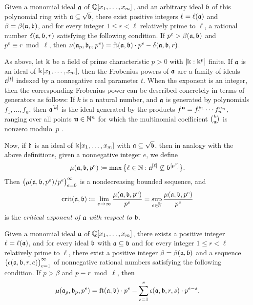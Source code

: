 \documentclass{amsart}
\begin{document}
\begin{theorem}
   \label{general-nu-theorem: T}
   Given a monomial ideal $\mathfrak{a}$ of $\mathbb{Q}[x_1, \ldots, x_m]$, and an arbitrary ideal $\mathfrak{b}$ of this polynomial ring with $\mathfrak{a} \subseteq \sqrt{\mathfrak{b}}$, there exist positive integers $\ell = \ell(\mathfrak{a})$ and  $\beta = \beta(\mathfrak{a}, \mathfrak{b})$, and for every integer $1 \leq r < \ell$ relatively prime to $\ell$, a rational number $\delta(\mathfrak{a}, \mathfrak{b}, r)$ satisfying the following condition.
   If $p^e > \beta(\mathfrak{a}, \mathfrak{b})$ and $p^e \equiv r \bmod \ell$, then $ \nu(\mathfrak{a}_p, \mathfrak{b}_p, p^e) = \operatorname{ft}(\mathfrak{a}, \mathfrak{b}) \cdot p^e - \delta(\mathfrak{a}, \mathfrak{b}, r)$.
\end{theorem}

As above, let $\Bbbk$ be a field of prime characteristic $p>0$ with $[\Bbbk: \Bbbk^p]$ finite.
If $\mathfrak{a}$ is an ideal of $\Bbbk[x_1, \ldots, x_m]$, then the Frobenius powers of $\mathfrak{a}$ are a family of ideals $\mathfrak{a}^{[t]}$ indexed by a nonnegative real parameter $t$.
When the exponent is an integer, then the corresponding Frobenius power can be described concretely in terms of generators as follows:
If $k$ is a natural number, and $\mathfrak{a}$ is generated by polynomials $f_1, \ldots, f_n$, then $\mathfrak{a}^{[k]}$ is the ideal generated by the products $f^{\mathbf{u}} = f_1^{u_1}\cdots f_n^{u_n}$, ranging over all points $\mathbf{u} \in \mathbb{N}^n$ for which the multinomial coefficient $\binom{k}{\mathbf{u}}$ is nonzero modulo~$p$  \cite[Proposition~3.5]{hernandez+etal.frobenius_powers}.

Now, if $\mathfrak{b}$ is an ideal of $\Bbbk[x_1, \ldots, x_m]$ with $\mathfrak{a} \subseteq \sqrt{\mathfrak{b}}$, then in analogy with the above definitions, given a nonnegative integer $e$, we define
\[\mu(\mathfrak{a},\mathfrak{b},p^e) \coloneqq \max\big\{\ell\in \mathbb{N} : \mathfrak{a}^{[\ell]} \not\subseteq \mathfrak{b}^{[p^e]}\big\}.\]
Then $\big(\mu(\mathfrak{a},\mathfrak{b},p^e)/p^e\big)_{e=0}^{\infty}$ is a nondecreasing bounded sequence, and
\begin{equation}\label{eq: crit as a limit of mus}
   \operatorname{crit}(\mathfrak{a},\mathfrak{b}) \coloneqq \lim_{e\to \infty} \frac{\mu(\mathfrak{a},\mathfrak{b},p^e)}{p^e} = \sup_{e\in \mathbb{N}} \frac{\mu(\mathfrak{a},\mathfrak{b},p^e)}{p^e}
\end{equation}
is the \emph{critical exponent of $\mathfrak{a}$ with respect to $\mathfrak{b}$}.

\begin{theorem}
   \label{general-mu-theorem: T}
   Given a monomial ideal $\mathfrak{a}$ of $\mathbb{Q}[x_1, \ldots, x_m]$, there exists a positive integer $\ell = \ell(\mathfrak{a})$, and for every ideal $\mathfrak{b}$ with $\mathfrak{a} \subseteq {\mathfrak{b}}$ and for every integer $1 \leq r < \ell$ relatively prime to $\ell$, there exist a positive integer $\beta = \beta(\mathfrak{a}, \mathfrak{b})$ and a sequence $\big(\epsilon(\mathfrak{a}, \mathfrak{b}, r, e)\big)_{e=1}^{\infty}$ of nonnegative rational numbers satisfying the following condition.
   If $p > \beta$ and $p \equiv r \bmod \ell$, then
   \[ \mu(\mathfrak{a}_p, \mathfrak{b}_p, p^e) = \operatorname{ft}(\mathfrak{a}, \mathfrak{b}) \cdot p^e - \sum_{s=1}^{e} \epsilon(\mathfrak{a}, \mathfrak{b}, r, s) \cdot p^{e-s}.\]
\end{theorem}
\end{document}
